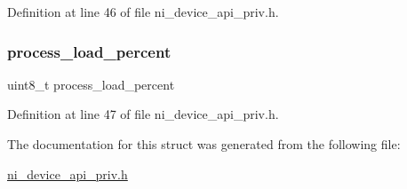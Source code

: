 Definition at line 46 of file ni\+\_\+device\+\_\+api\+\_\+priv.\+h.

\mbox{\label{struct__ni__instance__mgr__general__status_a1da1b7243a38cf621b15dae2123d4763}} 
\subsubsection{\texorpdfstring{process\_load\_percent}{process\_load\_percent}}
{\footnotesize\ttfamily uint8\+\_\+t process\+\_\+load\+\_\+percent}



Definition at line 47 of file ni\+\_\+device\+\_\+api\+\_\+priv.\+h.



The documentation for this struct was generated from the following file\+:\begin{DoxyCompactItemize}
\item 
\mbox{\hyperlink{ni__device__api__priv_8h}{ni\+\_\+device\+\_\+api\+\_\+priv.\+h}}\end{DoxyCompactItemize}
